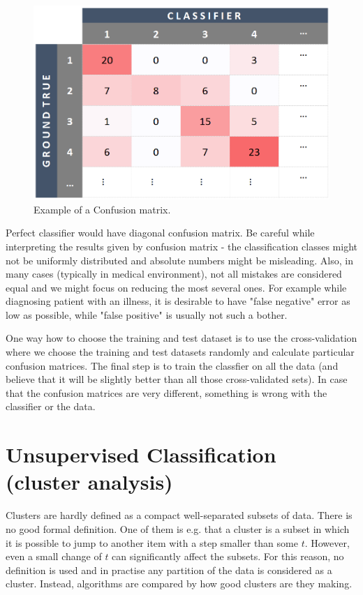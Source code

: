 \begin{figure}[h]
	\centering
	\includegraphics[scale=0.35]{ConfusionMatrix.png}
	\caption{Example of a Confusion matrix.}
\end{figure}
\clearpage
\begin{remark}
	Perfect classifier would have diagonal confusion matrix. Be careful while interpreting the results given by confusion matrix - the classification classes might not be uniformly distributed and absolute numbers might be misleading. Also, in many cases (typically in medical environment), not all mistakes are considered equal and we might focus on reducing the most several ones. For example while diagnosing patient with an illness, it is desirable to have "false negative" error as low as possible, while "false positive" is usually not such a bother.
\end{remark}

One way how to choose the training and test dataset is to use the cross-validation where we choose the training and test datasets randomly and calculate particular confusion matrices. The final step is to train the classfier on all the data (and believe that it will be slightly better than all those cross-validated sets). In case that the confusion matrices are very different, something is wrong with the classifier or the data.

\chapter{Unsupervised Classification (cluster analysis)}
Clusters are hardly defined as a compact well-separated subsets of data. There is no good formal definition. One of them is e.g. that a cluster is a subset in which it is possible to jump to another item with a step smaller than some $t$. However, even a small change of $t$ can significantly affect the subsets. For this reason, no definition is used and in practise any partition of the data is considered as a cluster. Instead, algorithms are compared by how good clusters are they making.


